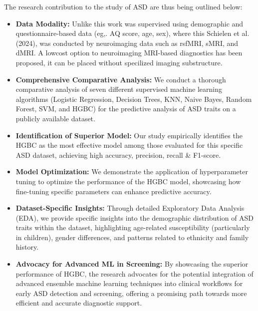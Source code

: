 \documentclass[pdflatex,sn-nature]{sn-jnl}
\theoremstyle{thmstyleone}%
\theoremstyle{thmstyletwo}%
\theoremstyle{thmstylethree}%
\begin{document}
The research contribution to the study of ASD are thus being outlined below:

\begin{itemize}
    \item \textbf{Data Modality:} Unlike this work was supervised using demographic and questionnaire-based data (eg,. AQ score, age, sex), where this Schielen et al. (2024), was conducted by neuroimaging data such as rsfMRI, sMRI, and dMRI. A lowcost option to neuroimaging MRI-based diagnostics has been proposed, it can be placed without specilized imaging substructure.
    \item \textbf{Comprehensive Comparative Analysis:} We conduct a thorough comparative analysis of seven different supervised machine learning algorithms (Logistic Regression, Decision Trees, KNN, Naive Bayes, Random Forest, SVM, and HGBC) for the predictive analysis of ASD traits on a publicly available dataset.
    \item \textbf{Identification of Superior Model:} Our study empirically identifies the HGBC as the most effective model among those evaluated for this specific ASD dataset, achieving high accuracy, precision, recall \& F1-score.
    \item \textbf{Model Optimization:} We demonstrate the application of hyperparameter tuning to optimize the performance of the HGBC model, showcasing how fine-tuning specific parameters can enhance predictive accuracy.
    \item \textbf{Dataset-Specific Insights:} Through detailed Exploratory Data Analysis (EDA), we provide specific insights into the demographic distribution of ASD traits within the dataset, highlighting age-related susceptibility (particularly in children), gender differences, and patterns related to ethnicity and family history.
    \item \textbf{Advocacy for Advanced ML in Screening:} By showcasing the superior performance of HGBC, the research advocates for the potential integration of advanced ensemble machine learning techniques into clinical workflows for early ASD detection and screening, offering a promising path towards more efficient and accurate diagnostic support.
\end{itemize}
\end{document}
